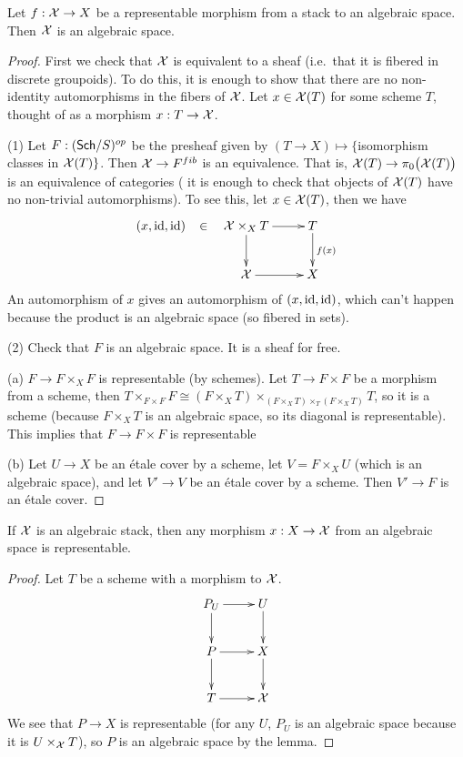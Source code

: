 
 \begin{lemma}
   Let $f:\mathcal{X}\to X$ be a representable morphism from a stack to an
algebraic space. Then
   $\mathcal{X}$ is an algebraic space.
 \end{lemma}
 \begin{proof}
   First we check that $\mathcal{X}$ is equivalent to a sheaf (i.e.~that it is
fibered in discrete
   groupoids). To do this, it is enough to show that there are no
non-identity
   automorphisms in the fibers of $\mathcal{X}$. Let $x\in \mathcal{X}(T)$ for some
scheme $T$, thought of
   as a morphism $x:T\to \mathcal{X}$.

   (1) Let $F:(\text{\sf Sch}/S)^{op}$ be the presheaf given by $(T\to
X)\mapsto \{$isomorphism
   classes in $\mathcal{X}(T)\}$. Then $\mathcal{X}\to F^{fib}$ is an equivalence. That
is, $\mathcal{X}(T)\to
   \pi_0\bigl(\mathcal{X}(T)\bigr)$ is an equivalence of categories
( it is enough
   to check that objects of $\mathcal{X}(T)$ have no non-trivial
automorphisms). To see this, let
   $x\in \mathcal{X}(T)$, then we have
   \[\xymatrix{
    (x,\id,\id)\ar@{}[r]|{\mbox{$\in$}} &\X\times_X T \ar[r]\ar[d]&
T\ar[d]^{f(x)}\\
    & \X \ar[r] & X
   }\]
    An automorphism of $x$ gives an automorphism of $(x,\operatorname{id},\operatorname{id})$,
which can't happen
    because the product is an algebraic space (so fibered in sets).

    (2) Check that $F$ is an algebraic space. It is a sheaf for free.

    (a) $F\to F\times_X F$ is representable (by
    schemes). Let $T\to F\times F$ be a morphism from a scheme, then
$T\times_{F\times F}
    F\cong (F\times_X T)\times_{(F\times_X T)\times_T (F\times_X T)}
T$, so it is a
    scheme (because $F\times_X T$ is an algebraic space, so its
diagonal is representable). This implies that $F\to F\times F$ is
representable 

    (b) Let $U\to X$ be an \'etale cover by a scheme, let
$V=F\times_X U$ (which is
    an algebraic space), and let $V'\to V$ be an \'etale cover by a
scheme. Then $V'\to
    F$ is an \'etale cover.
 \end{proof}
 \begin{corollary}
   If $\mathcal{X}$ is an algebraic stack, then any morphism $x:X\to \mathcal{X}$ from
an algebraic space
   is representable.
 \end{corollary}
 \begin{proof}
   Let $T$ be a scheme with a morphism to $\mathcal{X}$.
   \[\xymatrix{
    P_U\ar[r]\ar[d] & U\ar[d]\\
    P\ar[r]\ar[d] & X\ar[d]\\
    T\ar[r] & \X
   }\]
    We see that $P\to X$ is representable (for any $U$, $P_U$ is an
algebraic space
   because it is $U\times_{\mathcal{X}} T$), so $P$ is an algebraic space by the
lemma.
 \end{proof}
